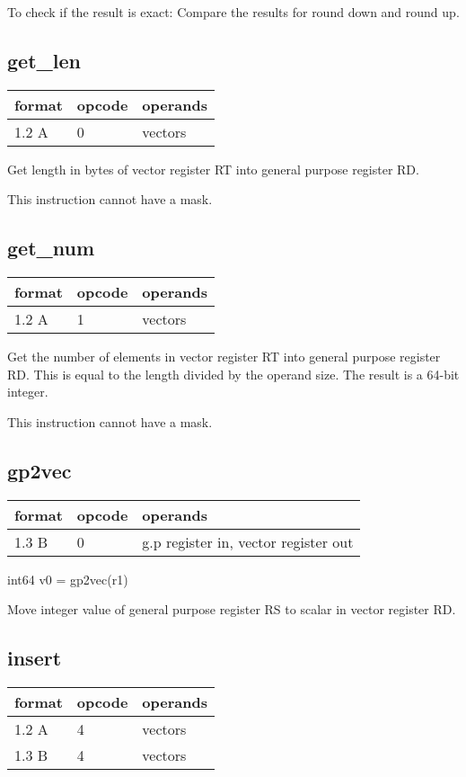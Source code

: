 \documentclass[forwardcom.tex]{subfiles}
\begin{document}
To check if the result is exact: Compare the results for round down and round up.


\subsection{get\_len}
\label{table:getLenInstruction}
\begin{tabular}{|p{12mm}|p{15mm}|p{100mm}|}
\hline
\bfseries format & \bfseries opcode & \bfseries operands \\ \hline
1.2 A & 0 & vectors  \\ \hline
\end{tabular}
\vv

Get length in bytes of vector register RT into general purpose register RD.
\vv

This instruction cannot have a mask.

\subsection{get\_num}
\label{table:getNumInstruction}
\begin{tabular}{|p{12mm}|p{15mm}|p{100mm}|}
\hline
\bfseries format & \bfseries opcode & \bfseries operands \\ \hline
1.2 A & 1 & vectors  \\ \hline
\end{tabular}
\vv

Get the number of elements in vector register RT into general purpose register RD. This is equal to the length divided by the operand size. The result is a 64-bit integer.
\vv

This instruction cannot have a mask.

\subsection{gp2vec}
\label{table:gp2vecInstruction}
\begin{tabular}{|p{12mm}|p{15mm}|p{100mm}|}
\hline
\bfseries format & \bfseries opcode & \bfseries operands \\ \hline
1.3 B & 0 & g.p register in, vector register out \\ \hline
\end{tabular}
\vv

int64 v0 = gp2vec(r1)
\vv

Move integer value of general purpose register RS to
scalar in vector register RD.
\vv


\subsection{insert}
\label{table:insertInstruction}
\begin{tabular}{|p{12mm}|p{15mm}|p{100mm}|}
\hline
\bfseries format & \bfseries opcode & \bfseries operands \\ \hline
1.2 A & 4 & vectors \\
1.3 B & 4 & vectors \\ \hline
\end{tabular}
\vv
\end{document}
